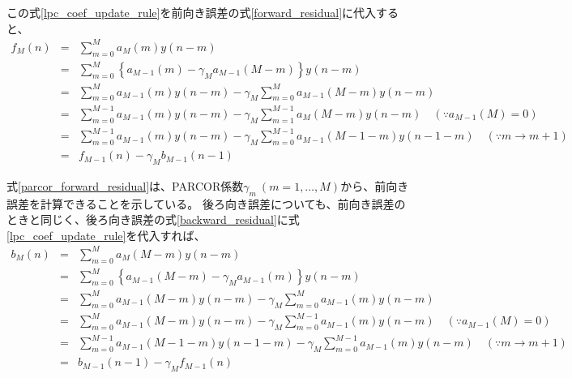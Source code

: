 \documentclass[uplatex,dvipdfmx,b5j,10pt]{jsbook}
\theoremstyle{definition}
\begin{document}
この式\ref{lpc_coef_update_rule}を前向き誤差の式\ref{forward_residual}に代入すると、
\begin{eqnarray}
  f_{M}(n) &=& \sum_{m=0}^{M} a_{M}(m) y(n-m) \nonumber \\
  &=& \sum_{m = 0}^{M} \left\{ a_{M-1}(m) - \gamma_{M} a_{M-1}(M-m) \right\} y(n - m) \nonumber \\
  &=& \sum_{m = 0}^{M} a_{M-1}(m)y(n - m) - \gamma_{M} \sum_{m = 0}^{M}a_{M-1}(M - m)y(n - m) \nonumber \\
  &=& \sum_{m = 0}^{M - 1} a_{M-1}(m)y(n - m) - \gamma_{M} \sum_{m = 1}^{M - 1}a_{M}(M - m)y(n - m) \quad (\because a_{M-1}(M) = 0) \nonumber \\
  &=& \sum_{m = 0}^{M - 1} a_{M-1}(m)y(n - m) - \gamma_{M} \sum_{m = 0}^{M - 1}a_{M-1}(M - 1 - m)y(n - 1 - m) \quad (\because m \to m + 1) \nonumber \\
  &=& f_{M-1}(n) - \gamma_{M} b_{M-1}(n-1) \label{parcor_forward_residual}
\end{eqnarray}

式\ref{parcor_forward_residual}は、PARCOR係数$\gamma_{m}\ (m = 1,\dots,M)$から、前向き誤差を計算できることを示している。
後ろ向き誤差についても、前向き誤差のときと同じく、後ろ向き誤差の式\ref{backward_residual}に式\ref{lpc_coef_update_rule}を代入すれば、
\begin{eqnarray}
  b_{M}(n) &=& \sum_{m=0}^{M} a_{M}(M-m) y(n-m) \nonumber \\
  &=& \sum_{m = 0}^{M} \left\{ a_{M-1}(M-m) - \gamma_{M} a_{M-1}(m) \right\} y(n - m) \nonumber \\
  &=& \sum_{m = 0}^{M} a_{M-1}(M-m)y(n - m) - \gamma_{M} \sum_{m = 0}^{M} a_{M-1}(m)y(n - m) \nonumber \\
  &=& \sum_{m = 0}^{M} a_{M-1}(M-m)y(n - m) - \gamma_{M} \sum_{m = 0}^{M - 1} a_{M-1}(m)y(n - m) \quad (\because a_{M-1}(M) = 0) \nonumber \\
  &=& \sum_{m = 0}^{M - 1} a_{M-1}(M - 1 - m)y(n - 1 - m) - \gamma_{M} \sum_{m = 0}^{M - 1} a_{M-1}(m)y(n - m) \quad (\because m \to m + 1) \nonumber \\ 
  &=& b_{M-1}(n - 1) - \gamma_{M} f_{M-1}(n) \label{parcor_backward_residual}
\end{eqnarray}
\end{document}
